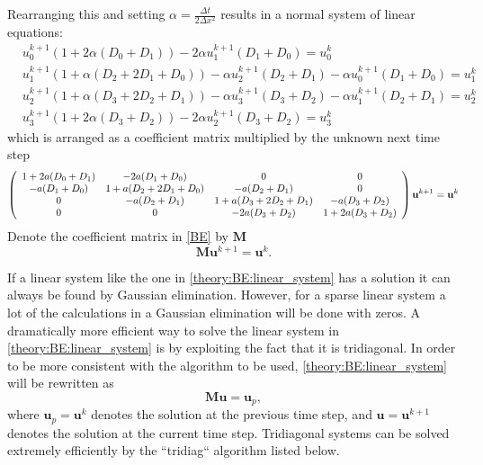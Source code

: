 \noindent Rearranging this and setting $\alpha = \frac{\Delta t}{2\Delta x^2}$ results in a normal system of linear equations:
\begin{align*}
 &u^{k+1}_0\left(1+2\alpha(D_0+D_1)\right)- 2\alpha u^{k+1}_{1}(D_1+D_0) =  u^k_0\\
 &u^{k+1}_1\left(1+\alpha(D_2+2D_1+D_0)\right)-\alpha u^{k+1}_{2}(D_2+D_1)-\alpha u^{k+1}_{0}(D_1+D_0) = u^k_1\\
 &u^{k+1}_2\left(1+\alpha(D_3+2D_2+D_1)\right)-\alpha u^{k+1}_{3}(D_3+D_2)-\alpha u^{k+1}_{1}(D_2+D_1) = u^k_2\\
 &u^{k+1}_3\left(1+2\alpha(D_3+D_2)\right)- 2\alpha u^{k+1}_{2}(D_3+D_2) =  u^k_3
\end{align*}
which is arranged as a coefficient matrix multiplied by the unknown next time step
{\scriptsize
\begin{align}\label{BE}
 \left(\begin{array}{c c c c}
        1+2a(D_0+D_1) & -2a(D_1+D_0) &0 &0 \\
        -a(D_1+D_0) &1+a(D_2+2D_1+D_0) & -a(D_2+D_1) &0 \\
        0& -a(D_2+D_1) & 1+a(D_3+2D_2+D_1)& -a(D_3+D_2)\\
        0& 0& - 2a(D_3+D_2)&1+2a(D_3+D_2) \\
       \end{array}\right)\mathbf{u}^{k+1} = \mathbf{u}^{k}
\end{align}
}
\noindent Denote the coefficient matrix in \eqref{BE} by $\mathbf M$
\begin{equation}\label{theory:BE:linear_system}
  \mathbf{M}\mathbf{u}^{k+1} = \mathbf{u}^{k}.
\end{equation}

\noindent If a linear system like the one in \eqref{theory:BE:linear_system} has a solution it can always be found by Gaussian elimination. 
However, for a sparse linear system a lot of the calculations in a Gaussian elimination will be done with zeros. 
A dramatically more efficient way to solve the linear system in \eqref{theory:BE:linear_system} is by exploiting the fact that it is tridiagonal. 
In order to be more consistent with the algorithm to be used, \eqref{theory:BE:linear_system} will be rewritten as
\begin{equation}
  \mathbf{M}\mathbf{u} = \mathbf{u}_p,
\end{equation}
where $\mathbf{u}_p = \mathbf{u}^{k}$ denotes the solution at the previous time step, and $\mathbf{u} =\mathbf{u}^{k+1}$ denotes the solution at the current time step. 
Tridiagonal systems can be solved extremely efficiently by the ``tridiag`` algorithm listed below. 


